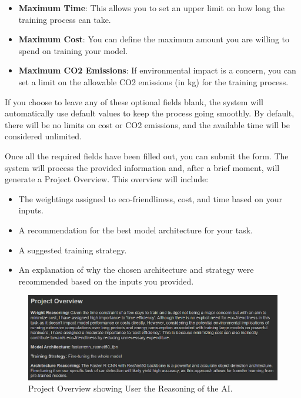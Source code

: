 \documentclass{report}
\begin{document}
\begin{itemize}
    \item \textbf{Maximum Time}: This allows you to set an upper limit on how long the training process can take.
    \item \textbf{Maximum Cost}: You can define the maximum amount you are willing to spend on training your model.
    \item \textbf{Maximum CO2 Emissions}: If environmental impact is a concern, you can set a limit on the allowable CO2 emissions (in kg) for the training process.
\end{itemize}

If you choose to leave any of these optional fields blank, the system will automatically use default values to keep the process going smoothly. By default, there will be no limits on cost or CO2 emissions, and the available time will be considered unlimited.

Once all the required fields have been filled out, you can submit the form. The system will process the provided information and, after a brief moment, will generate a Project Overview. This overview will include:

\begin{itemize}
    \item The weightings assigned to eco-friendliness, cost, and time based on your inputs.
    \item A recommendation for the best model architecture for your task.
    \item A suggested training strategy.
    \item An explanation of why the chosen architecture and strategy were recommended based on the inputs you provided.
\end{itemize}
\begin{figure}[!h]
    \centering
    \includegraphics[width=1\linewidth]{PORichitg.png}
    \caption{Project Overview showing  User the Reasoning of the AI.}
    \label{fig:enter-label}
\end{figure}
\end{document}
